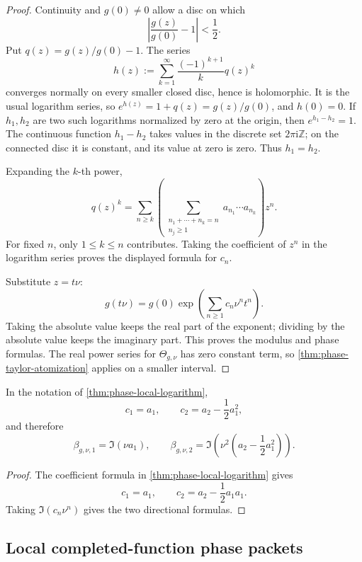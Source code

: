 \begin{proof}
Continuity and \(g(0)\ne0\) allow a disc on which
\[
 \left|\frac{g(z)}{g(0)}-1\right|<\frac12.
\]
Put \(q(z)=g(z)/g(0)-1\).  The series
\[
 h(z):=\sum_{k=1}^{\infty}\frac{(-1)^{k+1}}{k}q(z)^k
\]
converges normally on every smaller closed disc, hence is holomorphic.  It is
the usual logarithm series, so \(e^{h(z)}=1+q(z)=g(z)/g(0)\), and \(h(0)=0\).
If \(h_1,h_2\) are two such logarithms normalized by zero at the origin, then
\(e^{h_1-h_2}=1\).  The continuous function \(h_1-h_2\) takes values in the
discrete set \(2\pi\mathrm i\mathbb Z\); on the connected disc it is constant,
and its value at zero is zero.  Thus \(h_1=h_2\).

Expanding the \(k\)-th power,
\[
 q(z)^k
 =
 \sum_{n\geq k}
 \left(
 \sum_{\substack{n_1+\cdots+n_k=n\\n_j\geq1}}
 a_{n_1}\cdots a_{n_k}
 \right)z^n.
\]
For fixed \(n\), only \(1\leq k\leq n\) contributes.  Taking the coefficient of
\(z^n\) in the logarithm series proves the displayed formula for \(c_n\).

Substitute \(z=t\nu\):
\[
 g(t\nu)
 =
 g(0)\exp\left(\sum_{n\geq1}c_n\nu^nt^n\right).
\]
Taking the absolute value keeps the real part of the exponent; dividing by the
absolute value keeps the imaginary part.  This proves the modulus and phase
formulas.  The real power series for \(\Theta_{g,\nu}\) has zero constant term,
so \cref{thm:phase-taylor-atomization} applies on a smaller interval.
\end{proof}

\begin{corollary}
\label{cor:phase-first-two-atoms}
In the notation of \cref{thm:phase-local-logarithm},
\[
 c_1=a_1,
 \qquad
 c_2=a_2-\frac12a_1^2,
\]
and therefore
\[
 \beta_{g,\nu,1}=\Im(\nu a_1),
\qquad
 \beta_{g,\nu,2}
 =
 \Im\left(\nu^2\left(a_2-\frac12a_1^2\right)\right).
\]
\end{corollary}

\begin{proof}
The coefficient formula in \cref{thm:phase-local-logarithm} gives
\[
 c_1=a_1,
\qquad
 c_2=a_2-\frac12a_1a_1.
\]
Taking \(\Im(c_n\nu^n)\) gives the two directional formulas.
\end{proof}

\subsection{Local completed-function phase packets}

